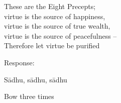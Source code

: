 \begin{english}
  These are the Eight Precepts;\\
  virtue is the source of happiness,\\
  virtue is the source of true wealth,\\
  virtue is the source of peacefulness --\\
  Therefore let virtue be purified
\end{english}

\begin{instruction}
  Response:
\end{instruction}

Sādhu, sādhu, sādhu

\begin{instruction}
  Bow three times
\end{instruction}

